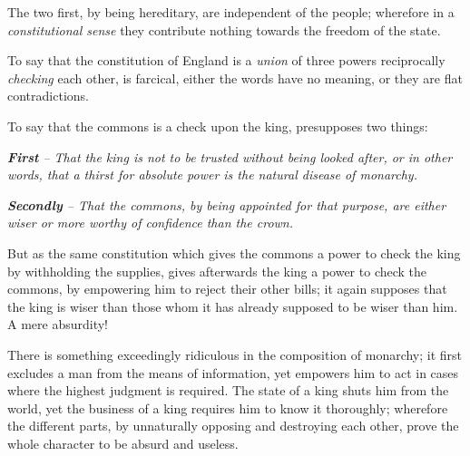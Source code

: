 \documentclass[12pt, twocolumn]{book}
\begin{document}
    \bigskip

    The two first, by being hereditary, are independent of the people; wherefore in a \textit{constitutional sense} they contribute nothing towards the freedom of the state.

    To say that the constitution of England is a \textit{union} of three powers reciprocally \textit{checking} each other, is farcical, either the words have no meaning, or they are flat contradictions.

    To say that the commons is a check upon the king, presupposes two things:

    \bigskip

    {\begin{adjustwidth}{0.5em}{0.5em} \small

        \centering \textit{\textbf{First} -- That the king is not to be trusted without being looked after, or in other words, that a thirst for absolute power is the natural disease of monarchy.}

        \medskip

        \textit{\textbf{Secondly} -- That the commons, by being appointed for that purpose, are either wiser or more worthy of confidence than the crown.}

    \end{adjustwidth}}

    \bigskip

    But as the same constitution which gives the commons a power to check the king by withholding the supplies, gives afterwards the king a power to check the commons, by empowering him to reject their other bills; it again supposes that the king is wiser than those whom it has already supposed to be wiser than him. A mere absurdity!

    There is something exceedingly ridiculous in the composition of monarchy; it first excludes a man from the means of information, yet empowers him to act in cases where the highest judgment is required. The state of a king shuts him from the world, yet the business of a king requires him to know it thoroughly; wherefore the different parts, by unnaturally opposing and destroying each other, prove the whole character to be absurd and useless.
\end{document}

